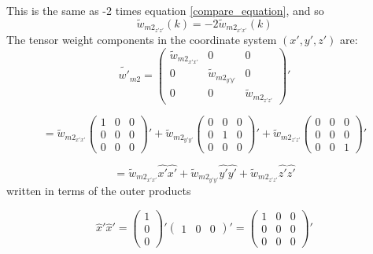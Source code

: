 \documentclass[letterpaper,twocolumn,amsmath,amssymb,prb]{revtex4-1}
\begin{document}
\begin{widetext}
This is the same as -2 times equation \ref{compare_equation}, and so \begin{equation}{\widetilde{w}_{{m2}_{z'z'}}(k)=-2\widetilde{w}_{{m2}_{x'x'}}(k)}\end{equation}
\[{}\]
\noindent The tensor weight components in the coordinate system $(x',y',z')$ are:
\begin{equation}\label{tensorcomp}{\widetilde{w'}_{m2}=\left(\begin{array}{ccc} \widetilde{w}_{{m2}_{x'x'}} & 0 & 0 \\ 0 & \widetilde{w}_{{m2}_{y'y'}} & 0 \\ 0 & 0 & \widetilde{w}_{{m2}_{z'z'}} \end{array}\right)'}\end{equation}

\begin{displaymath}{=\widetilde{w}_{{m2}_{x'x'}}\left(\begin{array}{ccc} 1 & 0 & 0 \\ 0 & 0 & 0 \\ 0 & 0 & 0 \end{array}\right)'+ \widetilde{w}_{{m2}_{y'y'}}\left(\begin{array}{ccc} 0 & 0 & 0 \\ 0 & 1 & 0 \\ 0 & 0 & 0 \end{array}\right)' + \widetilde{w}_{{m2}_{z'z'}}\left(\begin{array}{ccc} 0 & 0 & 0 \\ 0 & 0 & 0 \\ 0 & 0 & 1 \end{array}\right)'}\end{displaymath}

\begin{equation}{=\widetilde{w}_{{m2}_{x'x'}}\hat{x'}\hat{x'}+\widetilde{w}_{{m2}_{y'y'}}\hat{y'}\hat{y'}+\widetilde{w}_{{m2}_{z'z'}}\hat{z'}\hat{z'}}\end{equation}
written in terms of the outer products

\begin{displaymath}{\hat{x}'\hat{x}'= \left(\begin{array}{c} 1 \\ 0 \\ 0 \end{array}\right)'\left(\begin{array}{ccc} 1 & 0 & 0 \end{array}\right)'=\left(\begin{array}{ccc} 1 & 0 & 0 \\ 0 & 0 & 0 \\ 0 & 0 & 0 \end{array}\right)'}\end{displaymath}


\end{widetext}
\end{document}
